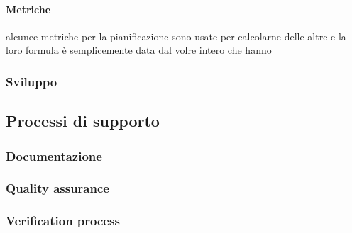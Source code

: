            \paragraph{Metriche}
           alcunee metriche per la pianificazione sono usate per calcolarne delle altre e la loro formula è semplicemente data dal volre intero che hanno
            \def\productquality{
            {   , 
                Budget at Completion,
                numero intero, 
                $ \pm 5 \% $ del preventivo,
                pari al preventivo
            },
            {   , 
                Earned value,
                BAC - $\%$ di lavoro completato, 
                $ >0$,
                $ >0$
            },
            {   , 
                Planned value,
                valore pianificato nel momento del calcolo, 
                $ >0$,
                $ >0$
            },
            {   , 
                Acual cost,
               numero intero, 
                0 < AC $\leq$ budget totale,
                0 < AC $\leq$ PV
            },
            {   , 
                Schedule variance,
               SV = EV - PV, 
                $ >0$,
                $ 0$
            },
            {   , 
                Cost variance,
               CV = EV - AC, 
                $ >0$,
                $ \geq 0$
            },
        }
 


        
    \subsubsection{Sviluppo}
        
        \subsection{Processi di supporto}
            \subsubsection{Documentazione}
            \subsubsection{Quality assurance}
            \subsubsection{Verification process}
